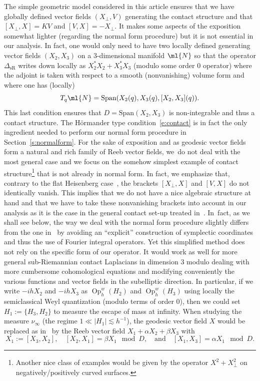 \documentclass[10pt]{amsart}
\theoremstyle{plain}
\theoremstyle{definition}
\theoremstyle{remark}
\newcommand{\Op}{\operatorname{Op}}
\begin{document}
The simple geometric model considered in this article ensures that we have globally defined vector fields $(X_\perp,V)$ generating the contact structure and that $[X_\perp,X]= KV$ and $[V,X]=-X_\perp$. It makes some aspects of the exposition somewhat lighter (\eg regarding the normal form procedure) but it is not essential in our analysis. In fact, one would only need to have two locally defined generating vector fields $(X_2,X_3)$ on a $3$-dimensional manifold $\ml{N}$ so that the operator $\Delta_{\text{sR}}$ writes down locally as $X_2^*X_2+X_3^*X_3$ (modulo some order $0$ operator) where the adjoint is taken with respect to a smooth (nonvanishing) volume form and where one has (locally)
\begin{equation}\label{e:contact}T_q\ml{N}=\text{Span}(X_2(q),X_3(q),[X_2,X_3](q)).\end{equation}
This last condition ensures that $D=\text{Span}(X_2,X_3)$ is non-integrable and thus a contact structure. The Hörmander type condition~\eqref{e:contact} is in fact the only ingredient needed to perform our normal form procedure in Section~\ref{s:normalform}. For the sake of exposition and as geodesic vector fields form a natural and rich family of Reeb vector fields, we~do not deal with the most general case and we focus on the somehow simplest example of contact structure\footnote{Another nice class of examples would be given by the operator $X^2+X_\perp^2$ on negatively/positively curved surfaces.} that is not already in normal form. In fact, we emphasize that, contrary to the flat Heisenberg case~\cite{ColindeVerdiereHillairetTrelat15, FermanianFischer21, FermanianLetrouit20}, the brackets $[X_\perp,X]$ and $[V,X]$ do not identically vanish. This implies that we do not have a nice algebraic structure at hand and that we have to take these nonvanishing brackets into account in our analysis as it is the case in the general contact set-up treated in~\cite{ColindeVerdiereHillairetTrelat15}. In~fact, as we shall see below, the way we deal with the normal form procedure slightly differs from the one in~\cite{ColindeVerdiereHillairetTrelat15} by avoiding an ``explicit'' construction of symplectic coordinates and thus the use of Fourier integral operators. Yet this simplified method does not rely on the specific form of our operator. It would work as well for more general sub-Riemannian contact Laplacians in dimension $3$ modulo dealing with more cumbersome cohomological equations and modifying conveniently the various functions and vector fields in the subelliptic direction. In particular, if we write $-ihX_2$ and $-ihX_3$ as $\Op^w_h(H_2)$ and $ \Op^w_h(H_3)$ using locally the semiclassical Weyl quantization (modulo terms of order $0$), then we could set $H_1:=\{H_3,H_2\}$ to measure the escape of mass at infinity. When studying the measure $\nu_\infty$ (\ie the regime $1\ll |H_1|\lesssim h^{-1}$), the geodesic vector field $X$ would be replaced as in~\cite{ColindeVerdiereHillairetTrelat15} by the Reeb vector field $X_1+\alpha X_2+\beta X_3$ with
\[
X_1:=[X_3,X_2],\quad [X_2,X_1]=\beta X_1 \mod D,\quad \text{and}\quad [X_1,X_3]=\alpha X_1 \mod D.
\]
\end{document}
